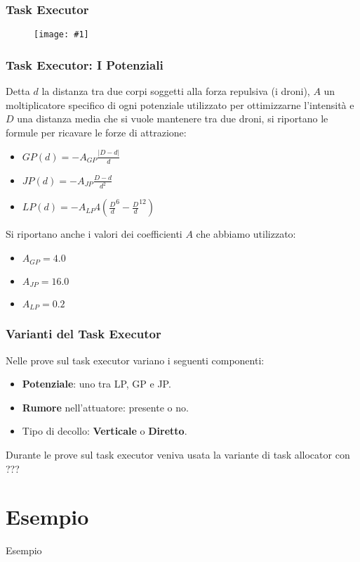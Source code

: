 \documentclass{beamer}
\newcommand{\putimage}[2] {
  \begin{figure}[H]
    \centering
    \texttt{[image: \#1]}
	\end{figure}
}
\begin{document}
\begin{frame}
\frametitle{Task Executor}
\putimage{images/task-executor.png}{0.99}
\end{frame}

\begin{frame}
\frametitle{Task Executor: I Potenziali}
Detta $d$ la distanza tra due corpi soggetti alla forza repulsiva (i droni), $A$ un moltiplicatore specifico di ogni potenziale utilizzato per ottimizzarne l'intensit\`a e $D$ una distanza media che si vuole mantenere tra due droni, si riportano le formule per ricavare le forze di attrazione:

\begin{itemize}
  \item $GP(d) = -A_{GP} \frac {|D - d|} {d}$
  \item $JP(d) = -A_{JP} \frac {D - d} {d^2}$
  \item $LP(d) = -A_{LP} 4 ({\frac {D} {d}}^6 - {\frac {D} {d}}^{12})$
\end{itemize}

Si riportano anche i valori dei coefficienti $A$ che abbiamo utilizzato:

\begin{itemize}
  \item $A_{GP} = 4.0$
  \item $A_{JP} = 16.0$
  \item $A_{LP} = 0.2$
\end{itemize}
\end{frame}

\begin{frame}
\frametitle{Varianti del Task Executor}
Nelle prove sul task executor variano i seguenti componenti:

\begin{itemize}
  \item \textbf{Potenziale}: uno tra LP, GP e JP.
  \item \textbf{Rumore} nell'attuatore: presente o no.
  \item Tipo di decollo: \textbf{Verticale} o \textbf{Diretto}.
\end{itemize}

Durante le prove sul task executor veniva usata la variante di task allocator con ???
\end{frame}

\section{Esempio}
\begin{frame}
\centering
\Huge
Esempio
\end{frame}
\end{document}
